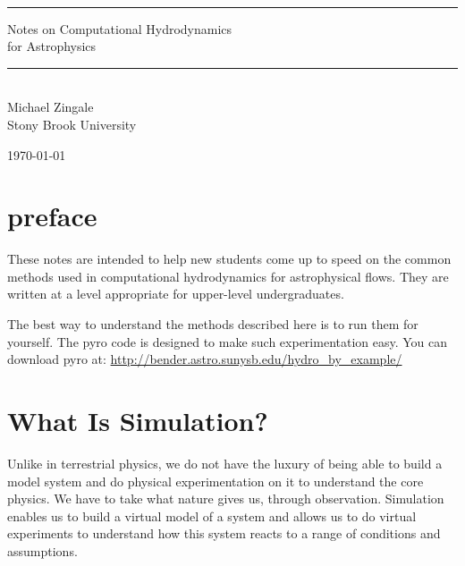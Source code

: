 \documentclass[11pt]{book}
\newcommand{\HRule}{\rule{\linewidth}{0.125mm}}
\begin{document}
\frontmatter

\begin{titlepage}

\ \\[2.5in]
\begin{center}
\HRule
{\Huge \textsf{{
Notes on Computational Hydrodynamics\\ for Astrophysics}}
}
\HRule
\\[2em]

{\Large \sf Michael Zingale} \\ {\sf Stony Brook University}
\end{center}

\vfill

\begin{flushright}
\today
\end{flushright}

\end{titlepage}

\setcounter{tocdepth}{2}
\tableofcontents

\clearpage

\chapter*{preface}

These notes are intended to help new students come up to speed on the
common methods used in computational hydrodynamics for astrophysical
flows.  They are written at a level appropriate for upper-level
undergraduates.

The best way to understand the methods described here is to run
them for yourself.  The {\sf pyro} code is designed to make such
experimentation easy.  You can download {\sf pyro} at: 
\url{http://bender.astro.sunysb.edu/hydro_by_example/}

\clearpage

\mainmatter


\chapter{What Is Simulation?}

Unlike in terrestrial physics, we do not have the luxury of being able
to build a model system and do physical experimentation on it to understand
the core physics.  We have to take what nature gives us, through observation.
Simulation enables us to build a virtual model of a system and allows us
to do virtual experiments to understand how this system reacts to a range
of conditions and assumptions.  
\end{document}
